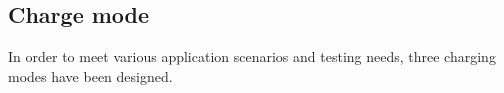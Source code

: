 \documentclass[
	english,
	ruledheaders=section,%
	class=report,%
	thesis={type=Report},%
	accentcolor=9c,%
	custommargins=true,%
	marginpar=false,%
	parskip=half-,%
	fontsize=11pt,%
	logofile={img/tuda_logo.pdf}, %
]{tudapub}
\begin{document}
\subsection{Charge mode}
\label{subsec: charge mode}

 In order to meet various application scenarios and testing needs, three charging modes have been designed.


    
\end{document}
